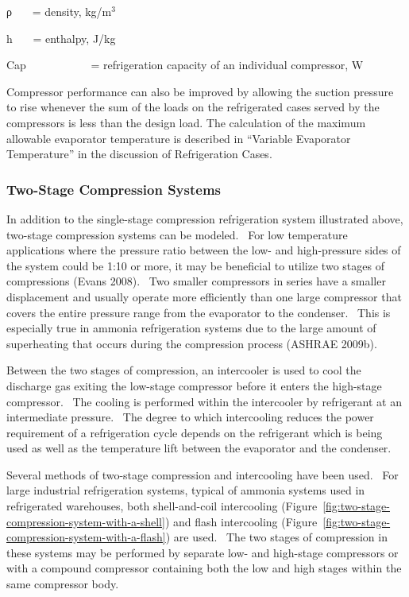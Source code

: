 ρ~~~ = density, kg/m\(^{3}\)

h~~~ = enthalpy, J/kg

Cap~~~~~~~~~~~ = refrigeration capacity of an individual compressor, W

Compressor performance can also be improved by allowing the suction pressure to rise whenever the sum of the loads on the refrigerated cases served by the compressors is less than the design load. The calculation of the maximum allowable evaporator temperature is described in ``Variable Evaporator Temperature'' in the discussion of Refrigeration Cases.

\subsubsection{Two-Stage Compression Systems}\label{two-stage-compression-systems}

In addition to the single-stage compression refrigeration system illustrated above, two-stage compression systems can be modeled.~ For low temperature applications where the pressure ratio between the low- and high-pressure sides of the system could be 1:10 or more, it may be beneficial to utilize two stages of compressions (Evans 2008).~ Two smaller compressors in series have a smaller displacement and usually operate more efficiently than one large compressor that covers the entire pressure range from the evaporator to the condenser.~ This is especially true in ammonia refrigeration systems due to the large amount of superheating that occurs during the compression process (ASHRAE 2009b).

Between the two stages of compression, an intercooler is used to cool the discharge gas exiting the low-stage compressor before it enters the high-stage compressor.~ The cooling is performed within the intercooler by refrigerant at an intermediate pressure.~ The degree to which intercooling reduces the power requirement of a refrigeration cycle depends on the refrigerant which is being used as well as the temperature lift between the evaporator and the condenser.

Several methods of two-stage compression and intercooling have been used.~ For large industrial refrigeration systems, typical of ammonia systems used in refrigerated warehouses, both shell-and-coil intercooling (Figure~\ref{fig:two-stage-compression-system-with-a-shell}) and flash intercooling (Figure~\ref{fig:two-stage-compression-system-with-a-flash}) are used.~ The two stages of compression in these systems may be performed by separate low- and high-stage compressors or with a compound compressor containing both the low and high stages within the same compressor body.

